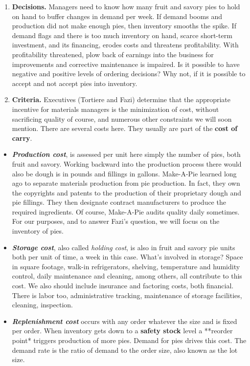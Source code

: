 \documentclass[
]{book}
\begin{document}
\begin{enumerate}
\def\labelenumi{\arabic{enumi}.}
\item
  \textbf{Decisions.} Managers need to know how many fruit and savory pies to hold on hand to buffer changes in demand per week. If demand booms and production did not make enough pies, then inventory smooths the spike. If demand flags and there is too much inventory on hand, scarce short-term investment, and its financing, erodes costs and threatens profitability. With profitability threatened, plow back of earnings into the business for improvements and corrective maintenance is impaired. Is it possible to have negative and positive levels of ordering decisions? Why not, if it is possible to accept and not accept pies into inventory.
\item
  \textbf{Criteria.} Executives (Tortiere and Fazi) determine that the appropriate incentive for materials managers is the minimization of cost, without sacrificing quality of course, and numerous other constraints we will soon mention. There are several costs here. They usually are part of the \textbf{cost of carry}.
\end{enumerate}

\begin{itemize}
\item
  \emph{\textbf{Production cost}}, is assessed per unit here simply the number of pies, both fruit and savory. Working backward into the production process there would also be dough is in pounds and fillings in gallons. Make-A-Pie learned long ago to separate materials production from pie production. In fact, they own the copyrights and patents to the production of their proprietary dough and pie fillings. They then designate contract manufacturers to produce the required ingredients. Of course, Make-A-Pie audits quality daily sometimes. For our purposes, and to answer Fazi's question, we will focus on the inventory of pies.
\item
  \emph{\textbf{Storage cost}}, also called \emph{holding cost}, is also in fruit and savory pie units both per unit of time, a week in this case. What's involved in storage? Space in square footage, walk-in refrigerators, shelving, temperature and humidity control, daily maintenance and cleaning, among others, all contribute to this cost. We also should include insurance and factoring costs, both financial. There is labor too, administrative tracking, maintenance of storage facilities, cleaning, inspection.
\item
  \emph{\textbf{Replenishment cost}} occurs with any order whatever the size and is fixed per order. When inventory gets down to a \textbf{safety stock} level a **reorder point* triggers production of more pies. Demand for pies drives this cost. The demand rate is the ratio of demand to the order size, also known as the lot size.
\end{itemize}
\end{document}
